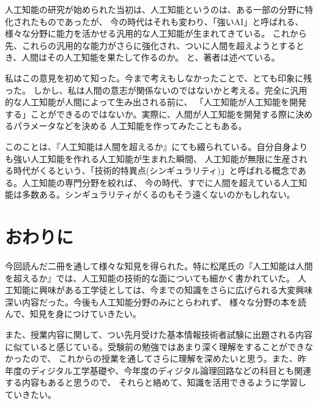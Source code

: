 \documentclass[uplatex]{jsarticle}
\begin{document}
    人工知能の研究が始められた当初は、人工知能というのは、ある一部の分野に特化されたものであったが、
    今の時代はそれも変わり、「強いAI」と呼ばれる、様々な分野に能力を活かせる汎用的な人工知能が生まれてきている。
    これから先、これらの汎用的な能力がさらに強化され、ついに人間を超えようとするとき、人間はその人工知能を果たして作るのか。
    と、著者は述べている。

    私はこの意見を初めて知った。今まで考えもしなかったことで、とても印象に残った。
    しかし、私は人間の意志が関係ないのではないかと考える。完全に汎用的な人工知能が人間によって生み出される前に、
    「人工知能が人工知能を開発する」ことができるのではないか。実際に、人間が人工知能を開発する際に決めるパラメータなどを決める
    人工知能を作ってみたこともある。

    このことは、『人工知能は人間を超えるか』にても綴られている。自分自身よりも強い人工知能を作れる人工知能が生まれた瞬間、
    人工知能が無限に生産される時代がくるという、「技術的特異点(シンギュラリティ)」と呼ばれる概念である。人工知能の専門分野を絞れば、
    今の時代、すでに人間を超えている人工知能は多数ある。シンギュラリティがくるのもそう遠くないのかもしれない。

\section{おわりに}
    今回読んだ二冊を通して様々な知見を得られた。特に松尾氏の『人工知能は人間を超えるか』では、人工知能の技術的な面についても細かく書かれていた。
    人工知能に興味がある工学徒としては、今までの知識をさらに広げられる大変興味深い内容だった。今後も人工知能分野のみにとらわれず、
    様々な分野の本を読んで、知見を身につけていきたい。

    また、授業内容に関して、つい先月受けた基本情報技術者試験に出題される内容に似ていると感じている。受験前の勉強ではあまり深く理解をすることができなかったので、
    これからの授業を通してさらに理解を深めたいと思う。また、昨年度のディジタル工学基礎や、今年度のディジタル論理回路などの科目とも関連する内容もあると思うので、
    それらと絡めて、知識を活用できるように学習していきたい。
\end{document}
